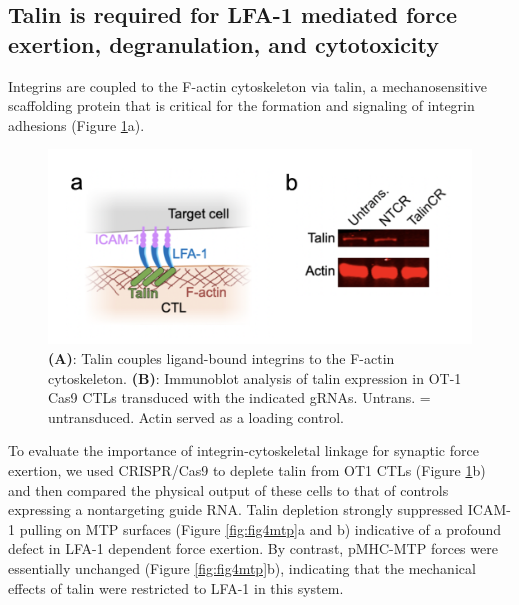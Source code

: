 \subsection{Talin is required for LFA-1 mediated force exertion, degranulation, and cytotoxicity}
Integrins are coupled to the F-actin cytoskeleton via talin, a mechanosensitive scaffolding protein that is critical for the formation and signaling of integrin adhesions \cite{Kim2011} (Figure \ref{fig:fig4model}a).

\begin{figure}[htbp]
	\centering
	\includegraphics[width=1.0\columnwidth]{../figures/chapter3/fig4model.png}
	\caption{Talin is required for LFA-1 mediated force exertion, degranulation, and
cytotoxicity.}
	\caption*{\textbf{(A)}: Talin couples ligand-bound integrins to the F-actin cytoskeleton. \textbf{(B)}: Immunoblot analysis of talin expression in OT-1 Cas9 CTLs transduced with the indicated gRNAs. Untrans. = untransduced. Actin served as a loading control.}
	\label{fig:fig4model}
\end{figure} 

To evaluate the importance of integrin-cytoskeletal linkage for synaptic force exertion, we used CRISPR/Cas9 to deplete talin from OT1 CTLs (Figure \ref{fig:fig4model}b) and then compared the physical output of these cells to that of controls expressing a nontargeting guide RNA. Talin depletion strongly suppressed ICAM-1 pulling on MTP surfaces (Figure \ref{fig:fig4mtp}a and b) indicative of a profound defect in LFA-1 dependent force exertion. By contrast, pMHC-MTP forces were essentially unchanged (Figure \ref{fig:fig4mtp}b), indicating that the mechanical effects of talin were restricted to LFA-1 in this system. 

